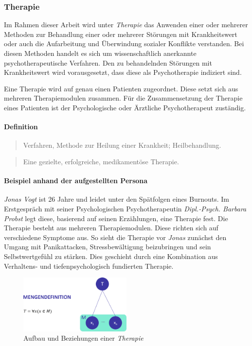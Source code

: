 \subsubsection{Therapie}
Im Rahmen dieser Arbeit wird unter \emph{Therapie} das Anwenden  einer oder mehrerer Methoden zur Behandlung einer oder mehrerer Störungen mit Krankheitswert oder auch die Aufarbeitung und Überwindung sozialer Konflikte verstanden. Bei diesen Methoden handelt es sich um wissenschaftlich anerkannte psychotherapeutische Verfahren. Den zu behandelnden Störungen mit Krankheitswert wird vorausgesetzt, dass diese als Psychotherapie indiziert sind.

Eine Therapie wird auf genau  einen Patienten zugeordnet. Diese setzt sich aus mehreren Therapiemodulen zusammen. Für die Zusammensetzung der Therapie eines Patienten ist der Psychologische oder Ärztliche Psychotherapeut zuständig.

\paragraph{Definition}
\begin{quote}
Verfahren, Methode zur Heilung einer Krankheit; Heilbehandlung. \cite{PsychThG4:online}
\end{quote}

\begin{quote}
	Eine gezielte, erfolgreiche, medikamentöse Therapie. \cite{44:online}
\end{quote}

\paragraph{Beispiel anhand der aufgestellten Persona}
\emph{Jonas Vogt} ist 26 Jahre und leidet unter den Spätfolgen eines Burnouts. Im Erstgespräch mit seiner Psychologischen Psychotherapeutin \emph{Dipl.-Psych. Barbara Probst} legt diese, basierend auf seinen Erzählungen, eine Therapie fest. Die Therapie besteht aus  mehreren Therapiemodulen. Diese richten sich auf verschiedene Symptome aus. So sieht die Therapie vor \emph{Jonas} zunächst den Umgang mit Panikattacken, Stressbewältigung beizubringen und sein Selbstwertgefühl zu stärken. Dies geschieht durch eine Kombination aus Verhaltens- und tiefenpsychologisch fundierten Therapie.

\begin{figure}[h]
\centering
\includegraphics[width=0.5\textwidth]{pictures/therapiedef}
\caption{Aufbau und Beziehungen einer \emph{Therapie}}
\label{therapiedef}
\end{figure}


